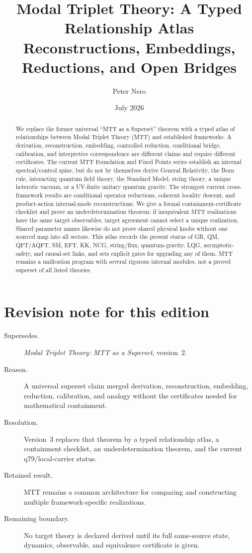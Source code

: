 \documentclass[11pt]{article}
\title{Modal Triplet Theory: A Typed Relationship Atlas\\
\large Reconstructions, Embeddings, Reductions, and Open Bridges}
\author{Peter Nero}
\date{July 2026}
\begin{document}
\maketitle

\begin{abstract}
We replace the former universal ``MTT as a Superset'' theorem with a typed
atlas of relationships between Modal Triplet Theory (MTT) and established
frameworks. A derivation, reconstruction, embedding, controlled reduction,
conditional bridge, calibration, and interpretive correspondence are
different claims and require different certificates. The current MTT
Foundation and Fixed Points series establish an internal spectral/control
spine, but do not by themselves derive General Relativity, the Born rule,
interacting quantum field theory, the Standard Model, string theory, a unique
heterotic vacuum, or a UV-finite unitary quantum gravity. The strongest current
cross-framework results are conditional operator reductions, coherent locality
descent, and product-action internal-mode reconstructions. We give a formal
containment-certificate checklist and prove an underdetermination theorem: if
inequivalent MTT realizations have the same target observables, target agreement
cannot select a unique realization. Shared parameter names likewise do not
prove shared physical knobs without one sourced map into all sectors. This
atlas records the present status of GR, QM, QFT/AQFT, SM, EFT, KK, NCG,
string/flux, quantum-gravity, LQG, asymptotic-safety, and causal-set links, and
sets explicit gates for upgrading any of them. MTT remains a unification
program with several rigorous internal modules, not a proved superset of all
listed theories.
\end{abstract}

\section*{Revision note for this edition}
\begin{description}
\item[Supersedes.] \emph{Modal Triplet Theory: MTT as a Superset}, version~2.
\item[Reason.] A universal superset claim merged derivation, reconstruction,
embedding, reduction, calibration, and analogy without the certificates needed
for mathematical containment.
\item[Resolution.] Version~3 replaces that theorem by a typed relationship
atlas, a containment checklist, an underdetermination theorem, and the current
q79/local-carrier status.
\item[Retained result.] MTT remains a common architecture for comparing and
constructing multiple framework-specific realizations.
\item[Remaining boundary.] No target theory is declared derived until its full
same-source state, dynamics, observable, and equivalence certificate is given.
\end{description}
\end{document}
